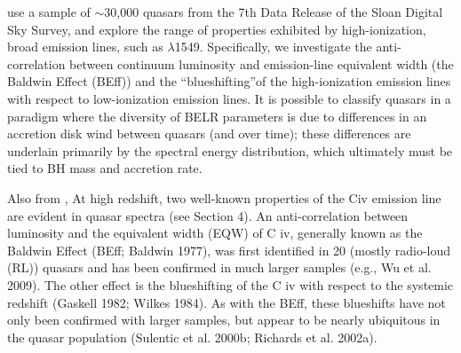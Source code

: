 \documentclass[a4paper,fleqn,usenatbib]{mnras}
\begin{document}
\citet{Richards2011} 
use a sample of $\sim$30,000 quasars from the 7th Data Release of the Sloan Digital Sky Survey, and explore the range of properties exhibited by high-ionization, broad emission lines, such as \civ $\lambda$1549. Specifically, we investigate the anti-correlation between continuum luminosity and emission-line equivalent width (the Baldwin Effect (BEff)) and the ``blueshifting''of the high-ionization emission lines with respect to low-ionization emission lines. 
It is possible to classify quasars in a paradigm where the diversity of BELR parameters is due to differences in an accretion disk wind between quasars (and over time); these differences are underlain primarily by the spectral energy distribution, which ultimately must be tied to BH mass and accretion rate.

Also from \citet{Richards2011}, 
At high redshift, two well-known properties of the Civ emission line are evident in quasar spectra (see Section 4). An anti-correlation between luminosity and the equivalent width (EQW) of C iv, generally known as the Baldwin Effect (BEff; Baldwin 1977), was first identified in 20 (mostly radio-loud (RL)) quasars and has been confirmed in much larger samples (e.g., Wu et al. 2009). The other effect is the blueshifting of the C iv with respect to the systemic redshift (Gaskell 1982; Wilkes 1984). As with the BEff, these blueshifts have not only been confirmed with larger samples, but appear to be nearly ubiquitous in the quasar population (Sulentic et al. 2000b; Richards et al. 2002a).
\end{document}
